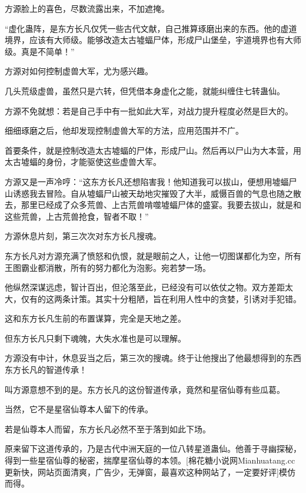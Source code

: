 
\begin{this_body}

方源脸上的喜色，尽数流露出来，不加遮掩。

“虚化蛊阵，是东方长凡仅凭一些古代文献，自己推算琢磨出来的东西。他的虚道境界，应该有大师级。能够改造太古墟蝠尸体，形成尸山堡垒，宇道境界也有大师级。真是不简单！”

方源对如何控制虚兽大军，尤为感兴趣。

几头荒级虚兽，虽然只是六转，但凭借本身虚化之能，就能纠缠住七转蛊仙。

方源不免就想：若是自己手中有一批如此大军，对战力提升程度必然是巨大的。

细细琢磨之后，他却发现控制虚兽大军的方法，应用范围并不广。

首要条件，就是控制改造太古墟蝠的尸体，形成尸山。然后再以尸山为大本营，用太古墟蝠的身份，才能驱使这些虚兽大军。

方源又是一声冷哼：“这东方长凡还想陷害我！他知道我可以拔山，便想用墟蝠尸山诱惑我去冒险。自从墟蝠尸山被天劫地灾摧毁了大半，威慑百兽的气息也随之散去，那里已经成了众多荒兽、上古荒兽啃噬墟蝠尸体的盛宴。我要去拔山，就是和这些荒兽，上古荒兽抢食，智者不取！”

方源休息片刻，第三次次对东方长凡搜魂。

东方长凡对方源充满了愤怒和仇恨，就是眼前之人，让他一切图谋都化为空，所有王图霸业都消散，所有的努力都化为泡影。宛若梦一场。

他纵然深谋远虑，智计百出，但沦落至此，已经没有可以依仗之物。双方差距太大，仅有的这两条计策。其实十分粗陋，旨在利用人性中的贪婪，引诱对手犯错。

这和东方长凡生前的布置谋算，完全是天地之差。

但东方长凡只剩下魂魄，大失水准也是可以理解。

方源没有中计，休息妥当之后，第三次的搜魂。终于让他搜出了他最想得到的东西东方长凡的智道传承！

叫方源意想不到的是。东方长凡的这份智道传承，竟然和星宿仙尊有些瓜葛。

当然，它不是星宿仙尊本人留下的传承。

若是仙尊本人而留，东方长凡必然不至于落到如此下场。

原来留下这道传承的，乃是古代中洲天庭的一位八转星道蛊仙。他善于寻幽探秘，得到一些星宿仙尊的秘密，揣摩星宿仙尊的本领。[棉花糖小说网Mianhuatang.cc更新快，网站页面清爽，广告少，无弹窗，最喜欢这种网站了，一定要好评]模仿而得。


\end{this_body}
